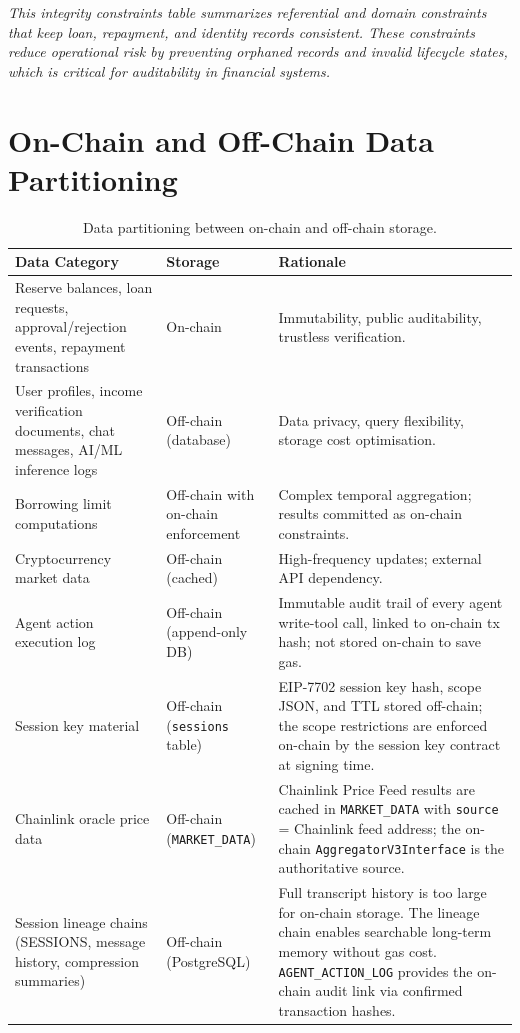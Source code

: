 \documentclass[12pt,a4paper]{report}
\begin{document}
\vspace{2pt}
\noindent\textit{\small This integrity constraints table summarizes referential and domain constraints that keep loan, repayment, and identity records consistent. These constraints reduce operational risk by preventing orphaned records and invalid lifecycle states, which is critical for auditability in financial systems.}


\section{On-Chain and Off-Chain Data Partitioning}

\begin{table}[H]
\centering
\caption{Data partitioning between on-chain and off-chain storage.}
\label{tab:data-partitioning}
\begin{tabular}{p{4.5cm}p{2.5cm}p{6.5cm}}
\hline
\textbf{Data Category} & \textbf{Storage} & \textbf{Rationale} \\
\hline
Reserve balances, loan requests, approval/rejection events, repayment transactions & On-chain & Immutability, public auditability, trustless verification. \\
\hline
User profiles, income verification documents, chat messages, AI/ML inference logs & Off-chain (database) & Data privacy, query flexibility, storage cost optimisation. \\
\hline
Borrowing limit computations & Off-chain with on-chain enforcement & Complex temporal aggregation; results committed as on-chain constraints. \\
\hline
Cryptocurrency market data & Off-chain (cached) & High-frequency updates; external API dependency. \\
\hline
Agent action execution log & Off-chain (append-only DB) & Immutable audit trail of every agent write-tool call, linked to on-chain tx hash; not stored on-chain to save gas. \\
\hline
Session key material & Off-chain (\texttt{sessions} table) & EIP-7702 session key hash, scope JSON, and TTL stored off-chain; the scope restrictions are enforced on-chain by the session key contract at signing time. \\
\hline
Chainlink oracle price data & Off-chain (\texttt{MARKET\_DATA}) & Chainlink Price Feed results are cached in \texttt{MARKET\_DATA} with \texttt{source} = Chainlink feed address; the on-chain \texttt{AggregatorV3Interface} is the authoritative source. \\
\hline
Session lineage chains (SESSIONS, message history, compression summaries) & Off-chain (PostgreSQL) & Full transcript history is too large for on-chain storage. The lineage chain enables searchable long-term memory without gas cost. \texttt{AGENT\_ACTION\_LOG} provides the on-chain audit link via confirmed transaction hashes. \\

\end{tabular}
\end{table}
\end{document}
